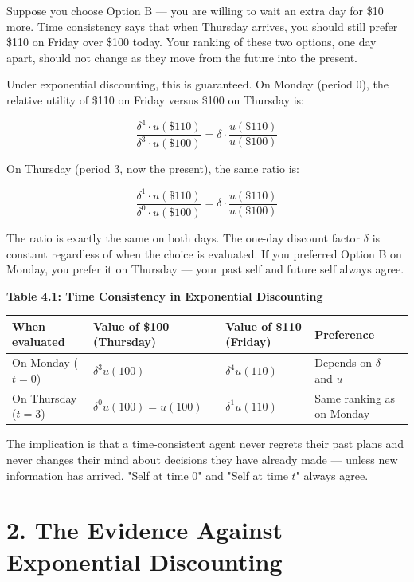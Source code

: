 \documentclass[12pt, letterpaper]{article}
\begin{document}
Suppose you choose Option B --- you are willing to wait an extra day for \$10 more. Time consistency says that when Thursday arrives, you should still prefer \$110 on Friday over \$100 today. Your ranking of these two options, one day apart, should not change as they move from the future into the present.

Under exponential discounting, this is guaranteed. On Monday (period 0), the relative utility of \$110 on Friday versus \$100 on Thursday is:

$$\frac{\delta^4 \cdot u(\$110)}{\delta^3 \cdot u(\$100)} = \delta \cdot \frac{u(\$110)}{u(\$100)}$$

On Thursday (period 3, now the present), the same ratio is:

$$\frac{\delta^1 \cdot u(\$110)}{\delta^0 \cdot u(\$100)} = \delta \cdot \frac{u(\$110)}{u(\$100)}$$

The ratio is exactly the same on both days. The one-day discount factor $\delta$ is constant regardless of when the choice is evaluated. If you preferred Option B on Monday, you prefer it on Thursday --- your past self and future self always agree.

\textbf{Table 4.1: Time Consistency in Exponential Discounting}


\begin{table}[H]
\centering
\small
\begin{tabularx}{\linewidth}{lYYY}
\toprule
When evaluated & Value of \$100 (Thursday) & Value of \$110 (Friday) & Preference \\
\midrule
On Monday ($t=0$) & $\delta^3 u(100)$ & $\delta^4 u(110)$ & Depends on $\delta$ and $u$ \\
On Thursday ($t=3$) & $\delta^0 u(100) = u(100)$ & $\delta^1 u(110)$ & Same ranking as on Monday \\
\bottomrule
\end{tabularx}
\end{table}


The implication is that a time-consistent agent never regrets their past plans and never changes their mind about decisions they have already made --- unless new information has arrived. "Self at time 0" and "Self at time $t$" always agree.

\medskip


\section{2. The Evidence Against Exponential Discounting}
\end{document}
